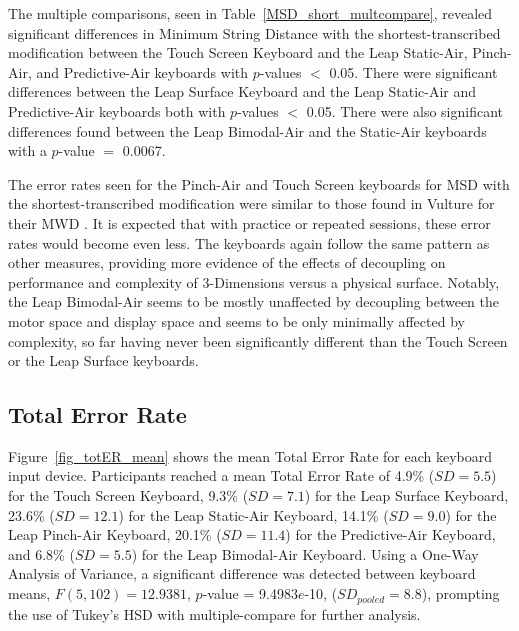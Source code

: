 The multiple comparisons, seen in Table~\ref{MSD_short_multcompare}, revealed significant differences in Minimum String Distance with the shortest-transcribed modification between the Touch Screen Keyboard and the Leap Static-Air, Pinch-Air, and Predictive-Air keyboards with $p$-values $<$ 0.05. There were significant differences between the Leap Surface Keyboard and the Leap Static-Air and Predictive-Air keyboards both with $p$-values $<$ 0.05. There were also significant differences found between the Leap Bimodal-Air and the Static-Air keyboards with a $p$-value $=$ 0.0067.

The error rates seen for the Pinch-Air and Touch Screen keyboards for MSD with the shortest-transcribed modification were similar to those found in Vulture for their MWD \cite{ref_vulture}. It is expected that with practice or repeated sessions, these error rates would become even less. The keyboards again follow the same pattern as other measures, providing more evidence of the effects of decoupling on performance and complexity of 3-Dimensions versus a physical surface. Notably, the Leap Bimodal-Air seems to be mostly unaffected by decoupling between the motor space and display space and seems to be only minimally affected by complexity, so far having never been significantly different than the Touch Screen or the Leap Surface keyboards.

\subsection{Total Error Rate}
Figure~\ref{fig_totER_mean} shows the mean Total Error Rate for each keyboard input device. Participants reached a mean Total Error Rate of 4.9\% ($SD = 5.5$) for the Touch Screen Keyboard, 9.3\% ($SD = 7.1$) for the Leap Surface Keyboard, 23.6\% ($SD = 12.1$) for the Leap Static-Air Keyboard, 14.1\% ($SD = 9.0$) for the Leap Pinch-Air Keyboard, 20.1\% ($SD = 11.4$) for the Predictive-Air Keyboard, and 6.8\% ($SD = 5.5$) for the Leap Bimodal-Air Keyboard. Using a One-Way Analysis of Variance, a significant difference was detected between keyboard means, $F(5, 102) = 12.9381$, $p$-value = 9.4983$e$-10, ($SD_{pooled} = 8.8$), prompting the use of Tukey's HSD with multiple-compare for further analysis.

